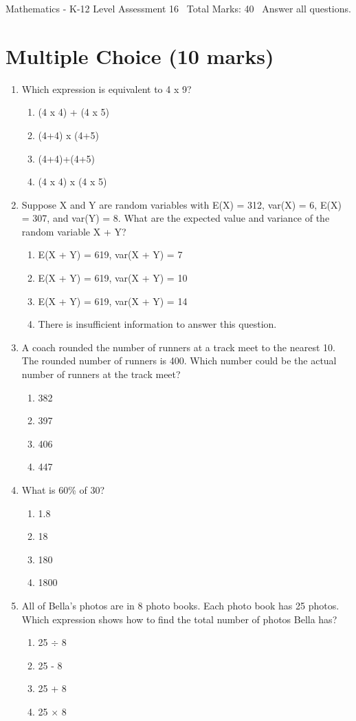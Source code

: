 \documentclass[12pt]{article}
\begin{document}
\begin{center}
Mathematics - K-12 Level Assessment 16 \
Total Marks: 40 \
Answer all questions.
\end{center}

\section*{Multiple Choice (10 marks)}
\begin{enumerate}[label=\arabic*.]
\item Which expression is equivalent to 4 x 9?
\begin{enumerate}[label=(\alph*)]
    \item (4 x 4) + (4 x 5)
    \item (4+4) x (4+5)
    \item (4+4)+(4+5)
    \item (4 x 4) x (4 x 5)
\end{enumerate}
\item Suppose X and Y are random variables with E(X) = 312, var(X) = 6, E(X) = 307, and var(Y) = 8. What are the expected value and variance of the random variable X + Y?
\begin{enumerate}[label=(\alph*)]
    \item E(X + Y) = 619, var(X + Y) = 7
    \item E(X + Y) = 619, var(X + Y) = 10
    \item E(X + Y) = 619, var(X + Y) = 14
    \item There is insufficient information to answer this question.
\end{enumerate}
\item A coach rounded the number of runners at a track meet to the nearest 10. The rounded number of runners is 400. Which number could be the actual number of runners at the track meet?
\begin{enumerate}[label=(\alph*)]
    \item 382
    \item 397
    \item 406
    \item 447
\end{enumerate}
\item What is 60\% of 30?
\begin{enumerate}[label=(\alph*)]
    \item 1.8
    \item 18
    \item 180
    \item 1800
\end{enumerate}
\item All of Bella's photos are in 8 photo books. Each photo book has 25 photos. Which expression shows how to find the total number of photos Bella has?
\begin{enumerate}[label=(\alph*)]
    \item 25 \ensuremath{\div} 8
    \item 25 - 8
    \item 25 + 8
    \item 25 \ensuremath{\times} 8
\end{enumerate}
\end{enumerate}
\end{document}

